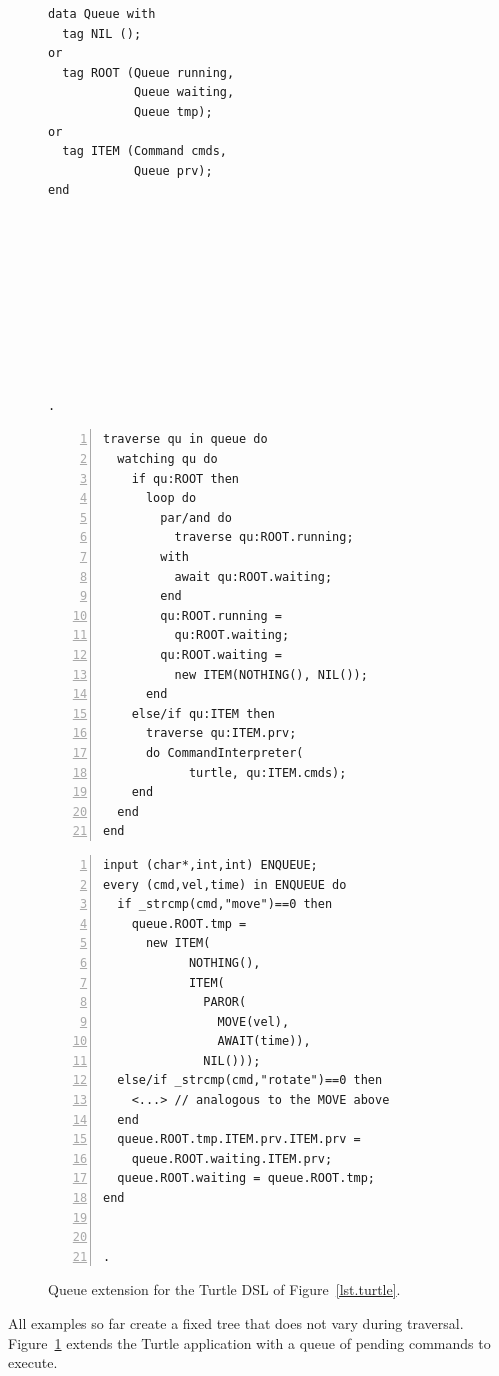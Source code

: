 \documentclass{sig-alternate}
\newcommand{\code}[1] {{\small{\texttt{#1}}}}
\begin{document}
\begin{figure}[t]
\begin{minipage}[t]{0.22\linewidth}
\begin{lstlisting}[title=CODE-3: \code{Queue} type]
data Queue with
  tag NIL ();
or
  tag ROOT (Queue running,
            Queue waiting,
            Queue tmp);
or
  tag ITEM (Command cmds,
            Queue prv);
end










.
\end{lstlisting}
\end{minipage}
%
\begin{minipage}[t]{0.36\linewidth}
\begin{lstlisting}[numbers=left,xleftmargin=3.5em,title=CODE-4: Queue traversal]
traverse qu in queue do
  watching qu do
    if qu:ROOT then
      loop do
        par/and do
          traverse qu:ROOT.running;
        with
          await qu:ROOT.waiting;
        end
        qu:ROOT.running =
          qu:ROOT.waiting;
        qu:ROOT.waiting =
          new ITEM(NOTHING(), NIL());
      end
    else/if qu:ITEM then
      traverse qu:ITEM.prv;
      do CommandInterpreter(
            turtle, qu:ITEM.cmds);
    end
  end
end
\end{lstlisting}
\end{minipage}
%
\begin{minipage}[t]{0.39\linewidth}
\begin{lstlisting}[numbers=left,xleftmargin=3.5em,title=CODE-5: Enqueuing commands]
input (char*,int,int) ENQUEUE;
every (cmd,vel,time) in ENQUEUE do
  if _strcmp(cmd,"move")==0 then
    queue.ROOT.tmp =
      new ITEM(
            NOTHING(),
            ITEM(
              PAROR(
                MOVE(vel),
                AWAIT(time)),
              NIL()));
  else/if _strcmp(cmd,"rotate")==0 then
    <...> // analogous to the MOVE above
  end
  queue.ROOT.tmp.ITEM.prv.ITEM.prv =
    queue.ROOT.waiting.ITEM.prv;
  queue.ROOT.waiting = queue.ROOT.tmp;
end


.
\end{lstlisting}
\end{minipage}
%
\caption{ Queue extension for the Turtle DSL of
          Figure~\ref{lst.turtle}.
\label{lst.turtle.queue}
}
\end{figure}

All examples so far create a fixed tree that does not vary during traversal.
%
Figure~\ref{lst.turtle.queue} extends the Turtle application with a queue of 
pending commands to execute.
\end{document}
